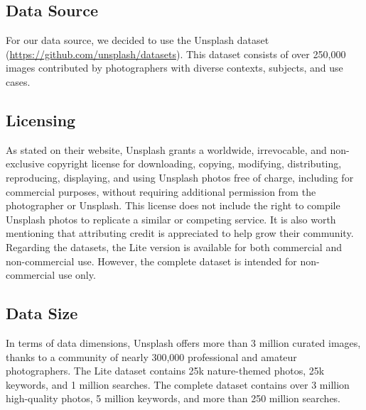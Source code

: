 \documentclass{article}
\begin{document}
    \subsection{Data Source}\label{subsec:data_source}
    For our data source, we decided to use the Unsplash dataset (\url{https://github.com/unsplash/datasets}).
    This dataset consists of over 250,000 images contributed by photographers with diverse contexts, subjects, and use cases.

    \subsection{Licensing}\label{subsec:licensing}
    As stated on their website, Unsplash grants a worldwide, irrevocable, and non-exclusive copyright license for
    downloading, copying, modifying, distributing, reproducing, displaying, and using Unsplash photos free of charge, including for commercial purposes, without requiring additional permission from the photographer or Unsplash.
    This license does not include the right to compile Unsplash photos to replicate a similar or competing service.
    It is also worth mentioning that attributing credit is appreciated to help grow their community.
    Regarding the datasets, the Lite version is available for both commercial and non-commercial use.
    However, the complete dataset is intended for non-commercial use only.

    \subsection{Data Size}\label{subsec:data_size}
    In terms of data dimensions, Unsplash offers more than 3 million curated images, thanks to a community of nearly 300,000 professional and amateur photographers.
    The Lite dataset contains 25k nature-themed photos, 25k keywords, and 1 million searches.
    The complete dataset contains over 3 million high-quality photos, 5 million keywords, and more than 250 million searches.
\end{document}
